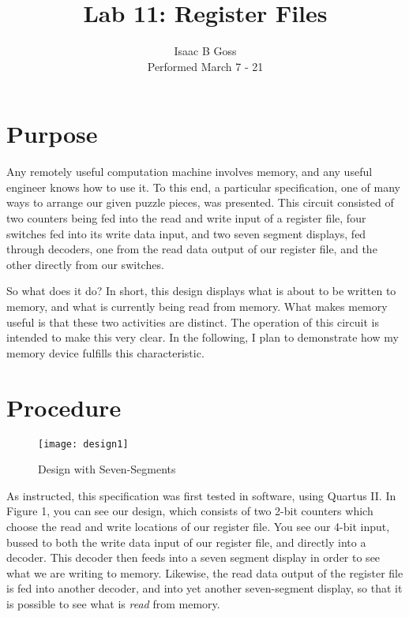 \documentclass[titlepage]{article}
\author{Isaac B Goss\\Performed March 7 - 21}
\title{Lab 11: Register Files}
\begin{document}
	\begin{titlepage}
	    \maketitle
	\end{titlepage}

    \section{Purpose}

        Any remotely useful computation machine involves memory, and any useful engineer knows how to use it.
        To this end, a particular specification, one of many ways to arrange our given puzzle pieces, was presented.
        This circuit consisted of two counters being fed into the read and write input of a register file, four switches fed into its write data input, and two seven segment displays, fed through decoders, one from the read data output of our register file, and the other directly from our switches.
        
        So what does it do?
        In short, this design displays what is about to be written to memory, and what is currently being read from memory.
        What makes memory useful is that these two activities are distinct.  
        The operation of this circuit is intended to make this very clear.
        In the following, I plan to demonstrate how my memory device fulfills this characteristic.
        
    \section{Procedure}
    
        \begin{figure}[h]
        	\centering
        	\texttt{[image: design1]}
        	\caption{Design with Seven-Segments}
        \end{figure}
        
        As instructed, this specification was first tested in software, using Quartus II.
        In Figure 1, you can see our design, which consists of two 2-bit counters which choose the read and write locations of our register file.
        You see our 4-bit input, bussed to both the write data input of our register file, and directly into a decoder.
        This decoder then feeds into a seven segment display in order to see what we are writing to memory.
        Likewise, the read data output of the register file is fed into another decoder, and into yet another seven-segment display, so that it is possible to see what is \textit{read} from memory.
        
\end{document}
